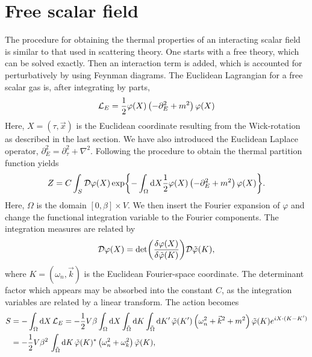 \section{Free scalar field}
\label{section:free scalar field}

The procedure for obtaining the thermal properties of an interacting scalar field is similar to that used in scattering theory.
One starts with a free theory, which can be solved exactly.
Then an interaction term is added, which is accounted for perturbatively by using Feynman diagrams.
The Euclidean Lagrangian for a free scalar gas is, after integrating by parts,
\begin{equation}
    \mathcal{L}_E = \frac{1}{2} \varphi(X) \left( -\partial_E^2 + m^2 \right) \varphi(X)
\end{equation}
Here, $X = (\tau, \vec x)$ is the Euclidean coordinate resulting from the Wick-rotation as described in the last section.
We have also introduced the Euclidean Laplace operator, $\partial_E^2 = \partial_\tau^2 + \nabla^2$.
Following the procedure to obtain the thermal partition function yields
\begin{equation}
    Z = C \int_S \mathcal{D} \varphi(X) 
    \exp{
        - \int_\Omega \dd X \frac{1}{2} 
        \varphi(X) \left( -\partial_E^2 + m^2 \right) \varphi(X)
    }.
\end{equation}
Here, $\Omega$ is the domain $[0, \beta] \times V$.
We then insert the Fourier expansion of $\varphi$ and change the functional integration variable to the Fourier components.
The integration measures are related by
\begin{equation*}
    \mathcal{D} \varphi(X) = \det(\frac{\delta \varphi(X)}{\delta \tilde \varphi(K)}) \mathcal{D}\tilde \varphi(K),
\end{equation*}
where $K = (\omega_n, \vec k)$ is the Euclidean Fourier-space coordinate.
The determinant factor which appears may be absorbed into the constant $C$, as the integration variables are related by a linear transform.
The action becomes 
\begin{align*}
    S & = - \int_\Omega \dd X\, \mathcal{L}_E 
    = - \frac{1}{2} V \beta \int_\Omega \dd X \int_{\tilde \Omega} \dd K \int_{\tilde \Omega} \dd K' \,
    \tilde \varphi(K') 
    \left(
        \omega_n^2 + \vec k^2 + m^2
    \right)
    \tilde \varphi(K)
    e^{iX\cdot(K - K')} \\
    & = - \frac{1}{2} V \beta^2 \, \int_{\tilde \Omega} \dd K \,
    \tilde \varphi(K)^*
    \left(
        \omega_n^2 + \omega_k^2
    \right)
    \tilde \varphi(K),
\end{align*}

